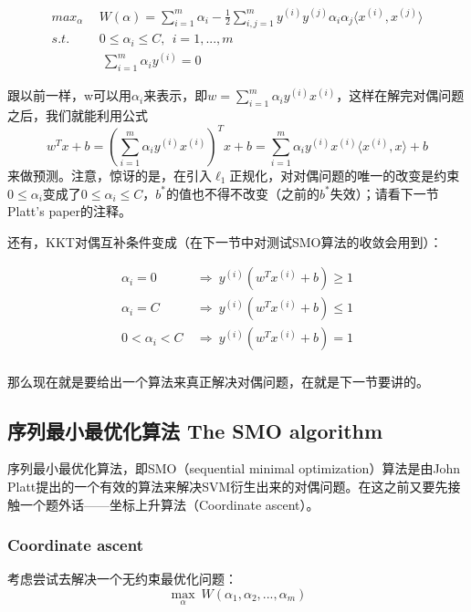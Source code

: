 \documentclass[UTF8]{ctexart}
\begin{document}
\begin{align*}
max_{\alpha} & \ \ W(\alpha) = \sum_{i=1}^{m} \alpha_{i} - \frac{1}{2} \sum_{i,j=1}^{m}y^{(i)}y^{(j)}\alpha_{i}\alpha_{j}\langle x^{(i)},x^{(j)}\rangle \\
s.t. & \ \ 0 \leq \alpha_{i}\leq C,\ \ i=1,...,m \\
\ & \ \ \ \sum_{i=1}^{m}\alpha_{i}y^{(i)} = 0
\end{align*}

跟以前一样，w可以用$\alpha_{i}$来表示，即$ w = \sum_{i=1}^{m} \alpha_{i}y^{(i)}x^{(i)} $，这样在解完对偶问题之后，我们就能利用公式\[w^{T}x+b = (\sum_{i=1}^{m} \alpha_{i}y^{(i)}x^{(i)} )^{T}x +b = \sum_{i=1}^{m}  \alpha_{i}y^{(i)}x^{(i)}\langle x^{(i)},x \rangle + b\] 来做预测。注意，惊讶的是，在引入$\ell_{1}$正规化，对对偶问题的唯一的改变是约束$0 \leq \alpha_{i}$变成了$ 0 \leq \alpha_{i}\leq C $，$b^{*}$的值也不得不改变（之前的$b^{*}$失效）；请看下一节Platt’s paper的注释。

还有，KKT对偶互补条件变成（在下一节中对测试SMO算法的收敛会用到）：


\begin{align*}
\alpha_{i} = 0\  & \Rightarrow \ y^{(i)}(w^{T}x^{(i)}+b) \geq 1 \\
\alpha_{i} = C \ & \Rightarrow \ y^{(i)}(w^{T}x^{(i)}+b) \leq 1 \\
0< \alpha_{i} < C\  & \Rightarrow \  y^{(i)}(w^{T}x^{(i)}+b) = 1 \\
\end{align*}

那么现在就是要给出一个算法来真正解决对偶问题，在就是下一节要讲的。



\subsection{序列最小最优化算法 The SMO algorithm}

序列最小最优化算法，即SMO（sequential minimal optimization）算法是由John Platt提出的一个有效的算法来解决SVM衍生出来的对偶问题。在这之前又要先接触一个题外话——坐标上升算法（Coordinate ascent）。

\subsubsection{Coordinate ascent}

考虑尝试去解决一个无约束最优化问题：
\[\mathop{max}\limits_{\alpha}\ W(\alpha_{1},\alpha_{2},...,\alpha_{m})   \]
\end{document}
